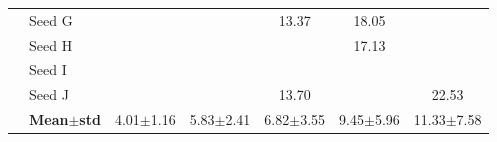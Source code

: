 \begin{table}[H]
{\begin{tabular}{@{}llccccc@{}}
 & Seed G & \cellcolor{RoyalBlue!10}{\small 5.19} & \cellcolor{RoyalBlue!10}{\small 4.68} & {\small\color{gray!60!black}13.37} & {\small\color{gray!60!black}18.05} & \cellcolor{RoyalBlue!10}{\small 6.55} \\
 & Seed H & \cellcolor{RoyalBlue!10}{\small 3.75} & \cellcolor{RoyalBlue!10}{\small 9.24} & \cellcolor{RoyalBlue!10}{\small 5.24} & {\small\color{gray!60!black}17.13} & \cellcolor{RoyalBlue!10}{\small 5.03} \\
 & Seed I & \cellcolor{RoyalBlue!10}{\small 3.73} & \cellcolor{RoyalBlue!10}{\small 4.09} & \cellcolor{RoyalBlue!10}{\small 5.48} & \cellcolor{RoyalBlue!10}{\small 5.45} & \cellcolor{RoyalBlue!10}{\small 5.99} \\
 & Seed J & \cellcolor{RoyalBlue!10}{\small 3.42} & \cellcolor{RoyalBlue!10}{\small 5.43} & {\small\color{gray!60!black}13.70} & \cellcolor{RoyalBlue!10}{\small 5.02} & {\small\color{gray!60!black}22.53} \\
 & \textbf{Mean$\pm$std} & \cellcolor{RoyalBlue!20}4.01$\pm$1.16 & \cellcolor{RoyalBlue!20}5.83$\pm$2.41 & \cellcolor{RoyalBlue!20}6.82$\pm$3.55 & \cellcolor{RoyalBlue!20}9.45$\pm$5.96 & \cellcolor{red!12}11.33$\pm$7.58 \\
\bottomrule
\end{tabular}
}
\end{table}

